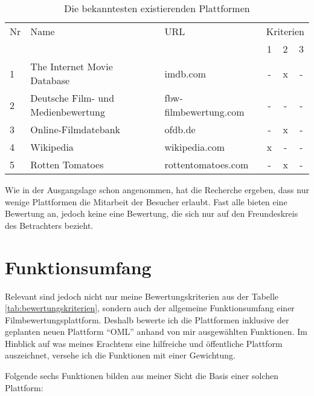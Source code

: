 \begin{table}[h]
\begin{center}
    \begin{tabular}{lllccc}
        \toprule Nr & Name & URL & \multicolumn{3}{c}{Kriterien} \\ & & & 1 & 2 & 3 \\
        \midrule 1 & The Internet Movie Database & imdb.com & - & x & - \\
        \midrule 2 & Deutsche Film- und Medienbewertung & fbw-filmbewertung.com & - & - & - \\
        \midrule 3 & Online-Filmdatebank & ofdb.de & - & x & - \\
        \midrule 4 & Wikipedia & wikipedia.com & x & - & - \\
        \midrule 5 & Rotten Tomatoes & rottentomatoes.com & - & x & - \\
        \bottomrule
    \end{tabular}
    \caption{Die bekanntesten existierenden Plattformen}
    \label{tab:plattformen}
\end{center}
\end{table}

Wie in der Ausgangslage schon angenommen, hat die Recherche ergeben, dass nur
wenige Plattformen die Mitarbeit der Besucher erlaubt. Fast alle bieten
eine Bewertung an, jedoch keine eine Bewertung, die sich nur auf den
Freundeskreis des Betrachters bezieht.

\section{Funktionsumfang}
Relevant sind jedoch nicht nur meine Bewertungskriterien aus der Tabelle \ref{tab:bewertungskriterien},
sondern auch der allgemeine Funktionsumfang einer Filmbewertungsplattform.
Deshalb bewerte ich die Plattformen inklusive der geplanten neuen Plattform ``OML'' 
anhand von mir ausgewählten Funktionen. Im Hinblick auf was meines Erachtens eine 
hilfreiche und öffentliche Plattform auszeichnet, versehe ich die Funktionen mit
einer Gewichtung.

Folgende sechs Funktionen bilden aus meiner Sicht die Basis einer solchen Plattform: 

